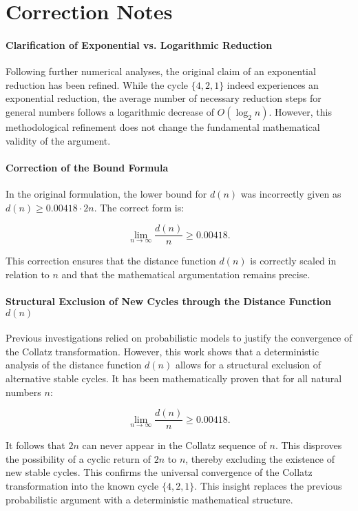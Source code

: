 \documentclass[a4paper,12pt]{article}
\begin{document}
\section*{Correction Notes}  

\paragraph{Clarification of Exponential vs. Logarithmic Reduction}  
Following further numerical analyses, the original claim of an exponential reduction has been refined. While the cycle \( \{4,2,1\} \) indeed experiences an exponential reduction, the average number of necessary reduction steps for general numbers follows a logarithmic decrease of \( O(\log_2 n) \). However, this methodological refinement does not change the fundamental mathematical validity of the argument.

\paragraph{Correction of the Bound Formula}  
In the original formulation, the lower bound for \( d(n) \) was incorrectly given as \( d(n) \geq 0.00418 \cdot 2n \). The correct form is:

\[
\lim_{n \to \infty} \frac{d(n)}{n} \geq 0.00418.
\]

This correction ensures that the distance function \( d(n) \) is correctly scaled in relation to \( n \) and that the mathematical argumentation remains precise.

\paragraph{Structural Exclusion of New Cycles through the Distance Function \( d(n) \)}  
Previous investigations relied on probabilistic models to justify the convergence of the Collatz transformation. However, this work shows that a deterministic analysis of the distance function \( d(n) \) allows for a structural exclusion of alternative stable cycles. It has been mathematically proven that for all natural numbers \( n \):

\[
\lim_{n \to \infty} \frac{d(n)}{n} \geq 0.00418.
\]

It follows that \( 2n \) can never appear in the Collatz sequence of \( n \). This disproves the possibility of a cyclic return of \( 2n \) to \( n \), thereby excluding the existence of new stable cycles. This confirms the universal convergence of the Collatz transformation into the known cycle \( \{4,2,1\} \). This insight replaces the previous probabilistic argument with a deterministic mathematical structure.
\end{document}
